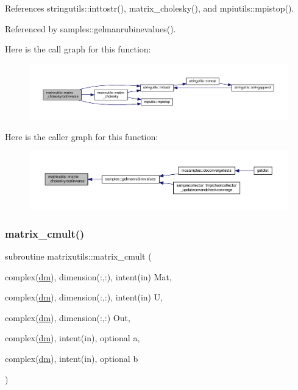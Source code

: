 References stringutils\+::inttostr(), matrix\+\_\+cholesky(), and mpiutils\+::mpistop().



Referenced by samples\+::gelmanrubinevalues().

Here is the call graph for this function\+:
\nopagebreak
\begin{figure}[H]
\begin{center}
\leavevmode
\includegraphics[width=350pt]{namespacematrixutils_acda49677dcf7603b255acba37dda9b92_cgraph}
\end{center}
\end{figure}
Here is the caller graph for this function\+:
\nopagebreak
\begin{figure}[H]
\begin{center}
\leavevmode
\includegraphics[width=350pt]{namespacematrixutils_acda49677dcf7603b255acba37dda9b92_icgraph}
\end{center}
\end{figure}
\mbox{\label{namespacematrixutils_a623ed13db8bf49d73e233e3668d3923c}} 
\subsubsection{\texorpdfstring{matrix\+\_\+cmult()}{matrix\_cmult()}}
{\footnotesize\ttfamily subroutine matrixutils\+::matrix\+\_\+cmult (\begin{DoxyParamCaption}\item[{complex(\mbox{\hyperlink{namespacematrixutils_a7bdc564986ea4d90f51201c75606ef3d}{dm}}), dimension(\+:,\+:), intent(in)}]{Mat,  }\item[{complex(\mbox{\hyperlink{namespacematrixutils_a7bdc564986ea4d90f51201c75606ef3d}{dm}}), dimension(\+:,\+:), intent(in)}]{U,  }\item[{complex(\mbox{\hyperlink{namespacematrixutils_a7bdc564986ea4d90f51201c75606ef3d}{dm}}), dimension(\+:,\+:)}]{Out,  }\item[{complex(\mbox{\hyperlink{namespacematrixutils_a7bdc564986ea4d90f51201c75606ef3d}{dm}}), intent(in), optional}]{a,  }\item[{complex(\mbox{\hyperlink{namespacematrixutils_a7bdc564986ea4d90f51201c75606ef3d}{dm}}), intent(in), optional}]{b }\end{DoxyParamCaption})}



